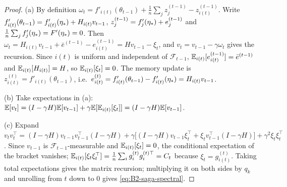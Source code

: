 \begin{proof}
(a) By definition $\omega_t=f'_{i(t)}(\theta_{t-1})+\frac1n\sum_jz_j^{(t-1)}-z_{i(t)}^{(t-1)}$. Write
$f'_{i(t)}(\theta_{t-1})=f'_{i(t)}(\eta_\ast)+H_{i(t)}v_{t-1}$, $z_j^{(t-1)}=f'_j(\eta_\ast)+e_j^{(t-1)}$ and
$\frac1n\sum_jf'_j(\eta_\ast)=F'(\eta_\ast)=0$. Then
$\omega_t=H_{i(t)}v_{t-1}+\bar e^{(t-1)}-e_{i(t)}^{(t-1)}=Hv_{t-1}-\xi_t$, and $v_t=v_{t-1}-\gamma\omega_t$ gives the
recursion. Since $i(t)$ is uniform and independent of $\mathcal F_{t-1}$, $\mathbb{E}_{i(t)}[e_{i(t)}^{(t-1)}]=\bar e^{(t-1)}$ and
$\mathbb{E}_{i(t)}[H_{i(t)}]=H$, so $\mathbb{E}_{i(t)}[\xi_t]=0$. The memory update is $z_{i(t)}^{(t)}=f'_{i(t)}(\theta_{t-1})$, i.e.\
$e_{i(t)}^{(t)}=f'_{i(t)}(\theta_{t-1})-f'_{i(t)}(\eta_\ast)=H_{i(t)}v_{t-1}$.

(b) Take expectations in (a): $\mathbb{E}[v_t]=(I-\gamma H)\mathbb{E}[v_{t-1}]+\gamma\mathbb{E}[\mathbb{E}_{i(t)}[\xi_t]]=(I-\gamma H)\mathbb{E}[v_{t-1}]$.

(c) Expand $v_tv_t^\top=(I-\gamma H)v_{t-1}v_{t-1}^\top(I-\gamma H)+\gamma\big[(I-\gamma H)v_{t-1}\xi_t^\top+\xi_tv_{t-1}^\top(I-\gamma H)\big]+\gamma^2\xi_t\xi_t^\top$.
Since $v_{t-1}$ is $\mathcal F_{t-1}$-measurable and $\mathbb{E}_{i(t)}[\xi_t]=0$, the conditional expectation of the bracket
vanishes; $\mathbb{E}_{i(t)}[\xi_t\xi_t^\top]=\frac1n\sum_ig_i^{(t)}g_i^{(t)\top}=C_t$ because $\xi_t=g_{i(t)}^{(t)}$. Taking total
expectations gives the matrix recursion; multiplying it on both sides by $q_k$ and unrolling from $t$ down to $0$
gives \eqref{eq:B2-saga-spectral}.
\end{proof}

